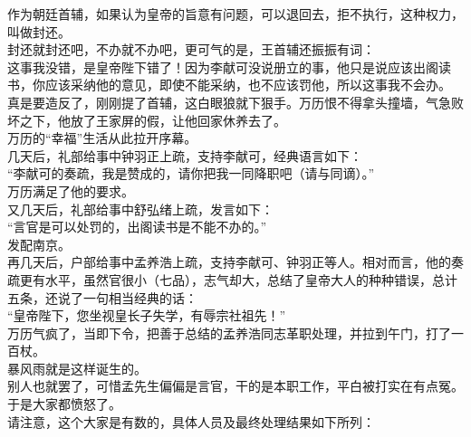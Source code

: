 \begin{multicols}{\theparacolNo}
作为朝廷首辅，如果认为皇帝的旨意有问题，可以退回去，拒不执行，这种权力，叫做封还。\\

封还就封还吧，不办就不办吧，更可气的是，王首辅还振振有词：\\

这事我没错，是皇帝陛下错了！因为李献可没说册立的事，他只是说应该出阁读书，你应该采纳他的意见，即使不能采纳，也不应该罚他，所以这事我不会办。\\

真是要造反了，刚刚提了首辅，这白眼狼就下狠手。万历恨不得拿头撞墙，气急败坏之下，他放了王家屏的假，让他回家休养去了。\\

万历的“幸福”生活从此拉开序幕。\\

几天后，礼部给事中钟羽正上疏，支持李献可，经典语言如下：\\

“李献可的奏疏，我是赞成的，请你把我一同降职吧（请与同谪）。”\\

万历满足了他的要求。\\

又几天后，礼部给事中舒弘绪上疏，发言如下：\\

“言官是可以处罚的，出阁读书是不能不办的。”\\

发配南京。\\

再几天后，户部给事中孟养浩上疏，支持李献可、钟羽正等人。相对而言，他的奏疏更有水平，虽然官很小（七品），志气却大，总结了皇帝大人的种种错误，总计五条，还说了一句相当经典的话：\\

“皇帝陛下，您坐视皇长子失学，有辱宗社祖先！”\\

万历气疯了，当即下令，把善于总结的孟养浩同志革职处理，并拉到午门，打了一百杖。\\

暴风雨就是这样诞生的。\\

别人也就罢了，可惜孟先生偏偏是言官，干的是本职工作，平白被打实在有点冤。\\

于是大家都愤怒了。\\

请注意，这个大家是有数的，具体人员及最终处理结果如下所列：\\


\end{multicols}
